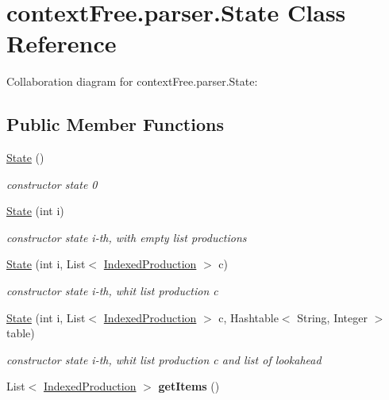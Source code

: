 \hypertarget{classcontext_free_1_1parser_1_1_state}{\section{context\-Free.\-parser.\-State Class Reference}
\label{classcontext_free_1_1parser_1_1_state}
}


Collaboration diagram for context\-Free.\-parser.\-State\-:
\subsection*{Public Member Functions}
\begin{DoxyCompactItemize}
\item 
\hypertarget{classcontext_free_1_1parser_1_1_state_a755084c050a72d0186cd27a8f78df9a6}{\hyperlink{classcontext_free_1_1parser_1_1_state_a755084c050a72d0186cd27a8f78df9a6}{State} ()}\label{classcontext_free_1_1parser_1_1_state_a755084c050a72d0186cd27a8f78df9a6}

\begin{DoxyCompactList}\small\item\em constructor state 0 \end{DoxyCompactList}\item 
\hyperlink{classcontext_free_1_1parser_1_1_state_aa31409b43285d446a6dc1e8423ed8f65}{State} (int i)
\begin{DoxyCompactList}\small\item\em constructor state i-\/th, with empty list productions \end{DoxyCompactList}\item 
\hyperlink{classcontext_free_1_1parser_1_1_state_a7267946f249aada006c55e3c47a3772b}{State} (int i, List$<$ \hyperlink{classcontext_free_1_1parser_1_1_indexed_production}{Indexed\-Production} $>$ c)
\begin{DoxyCompactList}\small\item\em constructor state i-\/th, whit list production c \end{DoxyCompactList}\item 
\hyperlink{classcontext_free_1_1parser_1_1_state_ab2b42f6581c76d56a2a6b31b8f9b5961}{State} (int i, List$<$ \hyperlink{classcontext_free_1_1parser_1_1_indexed_production}{Indexed\-Production} $>$ c, Hashtable$<$ String, Integer $>$ table)
\begin{DoxyCompactList}\small\item\em constructor state i-\/th, whit list production c and list of lookahead \end{DoxyCompactList}\item 
\hypertarget{classcontext_free_1_1parser_1_1_state_af1362b89e4973fd940a1a6ba440e9c9e}{List$<$ \hyperlink{classcontext_free_1_1parser_1_1_indexed_production}{Indexed\-Production} $>$ {\bfseries get\-Items} ()}\label{classcontext_free_1_1parser_1_1_state_af1362b89e4973fd940a1a6ba440e9c9e}


\end{DoxyCompactItemize}
